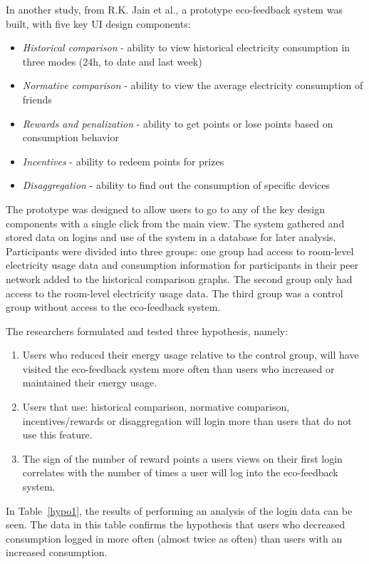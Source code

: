 \documentclass[journal]{vgtc}                %
\begin{document}
In another study, from R.K. Jain et al.\cite{jain2012assessing}, a prototype eco-feedback system was built, with five key UI design components:
\begin{itemize}
\item \textit{Historical comparison} - ability to view historical electricity consumption in three modes (24h, to date and last week)
\item \textit{Normative comparison} - ability to view the average electricity consumption of friends
\item \textit{Rewards and penalization} - ability to get points or lose points based on consumption behavior
\item \textit{Incentives} - ability to redeem points for prizes
\item \textit{Disaggregation} - ability to find out the consumption of specific devices
\end{itemize}

The prototype was designed to allow users to go to any of the key design components with a single click from the main view. The system gathered and stored data on logins and use of the system in a database for later analysis.\\

Participants were divided into three groups: one group had access to room-level electricity usage data and consumption information for participants in their peer network added to the historical comparison graphs. 
The second group only had access to the room-level electricity usage data.
The third group was a control group without access to the eco-feedback system.

The researchers formulated and tested three hypothesis, namely:
\begin{enumerate}
\item Users who reduced their energy usage relative to the control group, will have visited the eco-feedback system more often than users who increased or maintained their energy usage.
\item Users that use: historical comparison, normative comparison, incentives/rewards or disaggregation will login more than users that do not use this feature.
\item The sign of the number of reward points a users views on their first login correlates with the number of times a user will log into the eco-feedback system.
\end{enumerate}

In Table~\ref{hypo1}, the results of performing an analysis of the login data can be seen. The data in this table confirms the hypothesis that users who decreased consumption logged in more often (almost twice as often) than users with an increased consumption. \\
\end{document}
